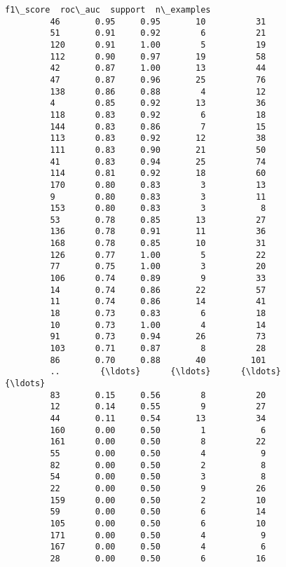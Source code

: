 \documentclass[11pt]{article}
\begin{document}
\begin{Verbatim}[commandchars=\\\{\}]
              f1\_score  roc\_auc  support  n\_examples  
         46       0.95     0.95       10          31  
         51       0.91     0.92        6          21  
         120      0.91     1.00        5          19  
         112      0.90     0.97       19          58  
         42       0.87     1.00       13          44  
         47       0.87     0.96       25          76  
         138      0.86     0.88        4          12  
         4        0.85     0.92       13          36  
         118      0.83     0.92        6          18  
         144      0.83     0.86        7          15  
         113      0.83     0.92       12          38  
         111      0.83     0.90       21          50  
         41       0.83     0.94       25          74  
         114      0.81     0.92       18          60  
         170      0.80     0.83        3          13  
         9        0.80     0.83        3          11  
         153      0.80     0.83        3           8  
         53       0.78     0.85       13          27  
         136      0.78     0.91       11          36  
         168      0.78     0.85       10          31  
         126      0.77     1.00        5          22  
         77       0.75     1.00        3          20  
         106      0.74     0.89        9          33  
         14       0.74     0.86       22          57  
         11       0.74     0.86       14          41  
         18       0.73     0.83        6          18  
         10       0.73     1.00        4          14  
         91       0.73     0.94       26          73  
         103      0.71     0.87        8          28  
         86       0.70     0.88       40         101  
         ..        {\ldots}      {\ldots}      {\ldots}         {\ldots}  
         83       0.15     0.56        8          20  
         12       0.14     0.55        9          27  
         44       0.11     0.54       13          34  
         160      0.00     0.50        1           6  
         161      0.00     0.50        8          22  
         55       0.00     0.50        4           9  
         82       0.00     0.50        2           8  
         54       0.00     0.50        3           8  
         22       0.00     0.50        9          26  
         159      0.00     0.50        2          10  
         59       0.00     0.50        6          14  
         105      0.00     0.50        6          10  
         171      0.00     0.50        4           9  
         167      0.00     0.50        4           6  
         28       0.00     0.50        6          16  

\end{Verbatim}
\end{document}
